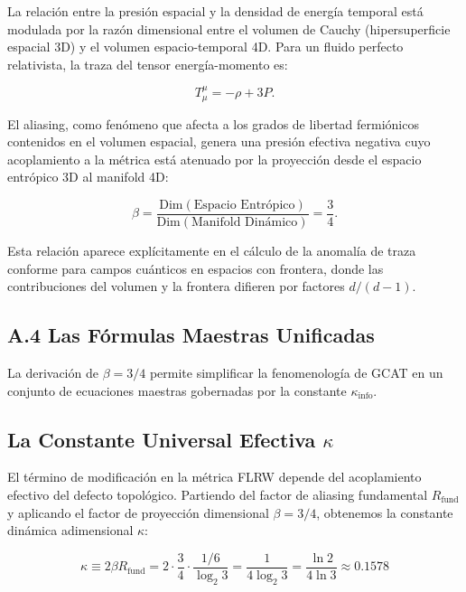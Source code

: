 \documentclass[12pt, a4paper]{article}
\theoremstyle{plain}
\theoremstyle{definition}
\begin{document}
La relación entre la presión espacial y la densidad de energía temporal está 
modulada por la razón dimensional entre el volumen de Cauchy (hipersuperficie 
espacial 3D) y el volumen espacio-temporal 4D. Para un fluido perfecto 
relativista, la traza del tensor energía-momento es:

\begin{equation}
T^\mu_\mu = -\rho + 3P.
\end{equation}

El aliasing, como fenómeno que afecta a los grados de libertad fermiónicos 
contenidos en el volumen espacial, genera una presión efectiva negativa cuyo 
acoplamiento a la métrica está atenuado por la proyección desde el espacio 
entrópico 3D al manifold 4D:

\begin{equation}
\beta = \frac{\text{Dim}(\text{Espacio Entrópico})}{\text{Dim}(\text{Manifold Dinámico})} = \frac{3}{4}.
\end{equation}

Esta relación aparece explícitamente en el cálculo de la anomalía de traza 
conforme para campos cuánticos en espacios con frontera, donde las 
contribuciones del volumen y la frontera difieren por factores $d/(d-1)$.


\subsection{A.4 Las Fórmulas Maestras Unificadas}
\label{app:master_formulas}

La derivación de $\beta = 3/4$ permite simplificar la fenomenología de GCAT en un conjunto de ecuaciones maestras gobernadas por la constante $\kappa_{\text{info}}$.

\subsection{La Constante Universal Efectiva $\kappa$}
El término de modificación en la métrica FLRW depende del acoplamiento efectivo del defecto topológico. Partiendo del factor de aliasing fundamental $R_{\text{fund}}$ y aplicando el factor de proyección dimensional $\beta=3/4$, obtenemos la constante dinámica adimensional $\kappa$:

\begin{equation}
\kappa \equiv 2\beta R_{\text{fund}} = 2 \cdot \frac{3}{4} \cdot \frac{1/6}{\log_2 3} = \frac{1}{4 \log_2 3} = \frac{\ln 2}{4 \ln 3} \approx 0.1578
\end{equation}
\end{document}

